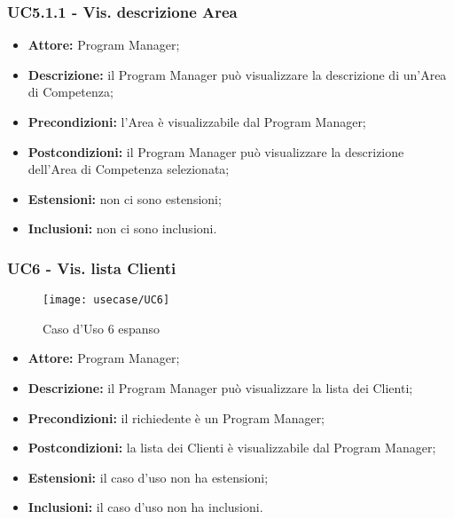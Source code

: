 \subsubsection*{UC5.1.1 - Vis. descrizione Area}
\begin{itemize}[label=$\circ$]
\item \textbf{Attore:} Program Manager;
\item \textbf{Descrizione:} il Program Manager può visualizzare la descrizione di un'Area di Competenza;
\item \textbf{Precondizioni:}  l'Area è visualizzabile dal Program Manager;
\item \textbf{Postcondizioni:} il Program Manager può visualizzare la descrizione dell'Area di Competenza selezionata;
\item \textbf{Estensioni:} non ci sono estensioni;
\item \textbf{Inclusioni:} non ci sono inclusioni.
\end{itemize}

\subsubsection*{UC6 - Vis. lista Clienti}
\begin{figure}[H] 
    \centering 
    \texttt{[image: usecase/UC6]} 
    \caption{Caso d'Uso 6 espanso}
\end{figure}
\begin{itemize}[label=$\circ$]
\item \textbf{Attore:} Program Manager;
\item \textbf{Descrizione:} il Program Manager può visualizzare la lista dei Clienti;
\item \textbf{Precondizioni:} il richiedente è un Program Manager;
\item \textbf{Postcondizioni:} la lista dei Clienti è visualizzabile dal Program Manager;
\item \textbf{Estensioni:} il caso d'uso non ha estensioni;
\item \textbf{Inclusioni:} il caso d'uso non ha inclusioni.
\end{itemize}

